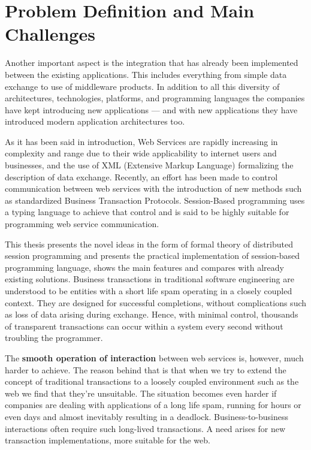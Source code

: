 \section{Problem Definition and Main Challenges}

Another important aspect is the integration that has already been implemented between the existing applications. This includes everything from simple data exchange to use of middleware products. In addition to all this diversity of architectures, technologies, platforms, and programming languages the companies have kept introducing new applications --- and with new applications they have introduced modern application architectures too. 

As it has been said in introduction, Web Services are rapidly increasing in complexity and range due to their wide applicability to internet users and businesses, and the use of XML (Extensive Markup Language) formalizing the description of data exchange. Recently, an effort has been made to control communication between web services with the introduction of new methods such as standardized Business Transaction Protocols. Session-Based programming uses a typing language to achieve that control and is said to be highly suitable for programming web service communication. 

This thesis presents the novel ideas in the form of formal theory of distributed session programming and presents the practical implementation of session-based programming language, shows the main features and compares with already existing solutions. Business transactions in traditional software engineering are understood to be entities with a short life spam operating in a closely coupled context. They are designed for successful completions, without complications such as loss of data arising during exchange. Hence, with minimal control, thousands of transparent transactions can occur within a system every second without troubling the programmer. 

The \textbf{smooth operation of interaction} between web services is, however, much harder to achieve. The reason behind that is that when we try to extend the concept of traditional transactions to a loosely coupled environment such as the web we find that they're unsuitable. The situation becomes even harder if companies are dealing with applications of a long life spam, running for hours or even days and almost inevitably resulting in a deadlock. Business-to-business interactions often require such long-lived transactions. A need arises for new transaction implementations, more suitable for the web.

